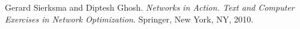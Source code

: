 \begin{thebibliography}{9}

Gerard Sierksma and Diptesh Ghosh.
\emph{Networks in Action. Text and Computer Exercises in Network Optimization}.
Springer, New York, NY, 2010.

\end{thebibliography}
